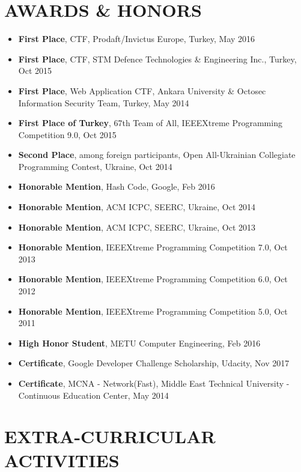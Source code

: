 \documentclass[margin, 10pt]{res} %
\begin{document}
\begin{resume}
        \section{AWARDS \& HONORS}
        \begin{itemize}
            \itemsep -2pt %
            \item {\bf First Place}, CTF, Prodaft/Invictus Europe, Turkey, May 2016
            \item {\bf First Place}, CTF, STM Defence Technologies \& Engineering Inc., Turkey, Oct 2015
            \item {\bf First Place}, Web Application CTF, Ankara University \& Octosec Information Security Team, Turkey, May 2014
            \item {\bf First Place of Turkey}, 67th Team of All, IEEEXtreme Programming Competition 9.0, Oct 2015
            \item {\bf Second Place}, among foreign participants, Open All-Ukrainian Collegiate Programming Contest, Ukraine, Oct 2014
            \item {\bf Honorable Mention}, Hash Code, Google, Feb 2016
            \item {\bf Honorable Mention}, ACM ICPC, SEERC, Ukraine, Oct 2014
            \item {\bf Honorable Mention}, ACM ICPC, SEERC, Ukraine, Oct 2013
            \item {\bf Honorable Mention}, IEEEXtreme Programming Competition 7.0, Oct 2013
            \item {\bf Honorable Mention}, IEEEXtreme Programming Competition 6.0, Oct 2012
            \item {\bf Honorable Mention}, IEEEXtreme Programming Competition 5.0, Oct 2011
            \item {\bf High Honor Student}, METU Computer Engineering, Feb 2016
            \item {\bf Certificate}, Google Developer Challenge Scholarship, Udacity, Nov 2017
            \item {\bf Certificate}, MCNA - Network(Fast), Middle East Technical University - Continuous Education Center, May 2014
        \end{itemize}



        \section{EXTRA-CURRICULAR \\ ACTIVITIES}


\end{resume}
\end{document}
